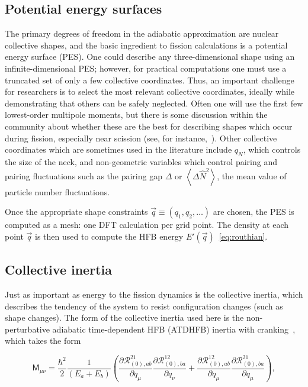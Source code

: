 \subsection{Potential energy surfaces}
The primary degrees of freedom in the adiabatic approximation are nuclear collective shapes, and the basic ingredient to fission calculations is a potential energy surface (PES). One could describe any three-dimensional shape using an infinite-dimensional PES; however, for practical computations one must use a truncated set of only a few collective coordinates. Thus, an important challenge for researchers is to select the most relevant collective coordinates, ideally while demonstrating that others can be safely neglected. Often one will use the first few lowest-order multipole moments, but there is some discussion within the community about whether these are the best for describing shapes which occur during fission, especially near scission (see, for instance,~\cite{younes2012}). Other collective coordinates which are sometimes used in the literature include $q_N$, which controls the size of the neck, and non-geometric variables which control pairing and pairing fluctuations such as the pairing gap $\Delta$ or $\left\langle \Delta \hat{N}^2 \right\rangle$, the mean value of particle number fluctuations.

Once the appropriate shape constraints $\vec{q}\equiv(q_1, q_2, \dots)$ are chosen, the PES is computed as a mesh: one DFT calculation per grid point. The density at each point $\vec{q}$ is then used to compute the HFB energy $E'(\vec{q})$~\eqref{eq:routhian}.

\subsection{Collective inertia}
Just as important as energy to the fission dynamics is the collective inertia, which describes the tendency of the system to resist configuration changes (such as shape changes). The form of the collective inertia used here is the non-perturbative adiabatic time-dependent HFB (ATDHFB) inertia with cranking~\cite{Baran2011}, which takes the form

\begin{equation}\label{eq:mATDHFB-np}
\mathsf{M}_{\mu\nu} =  \frac{\hbar^2}{2}\frac{1}{(E_a+E_b)}\left(\frac{\partial\mathcal{R}^{21}_{(0),ab}}{\partial q_\mu}\frac{\partial\mathcal{R}^{12}_{(0),ba}}{\partial q_\nu}+\frac{\partial\mathcal{R}^{12}_{(0),ab}}{\partial q_\mu}\frac{\partial\mathcal{R}^{21}_{(0),ba}}{\partial q_\mu}\right),
\end{equation}

